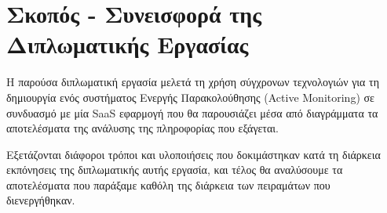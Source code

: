 \section{Σκοπός - Συνεισφορά της Διπλωματικής Εργασίας}
\label{section:contribution}

Η παρούσα διπλωματική εργασία μελετά τη χρήση σύγχρονων τεχνολογιών για τη δημιουργία
ενός συστήματος Ενεργής Παρακολούθησης (Active Monitoring) σε συνδυασμό με μία SaaS εφαρμογή
που θα παρουσιάζει μέσα από διαγράμματα τα αποτελέσματα της ανάλυσης της πληροφορίας που εξάγεται.

Εξετάζονται διάφοροι τρόποι και υλοποιήσεις που δοκιμάστηκαν κατά τη διάρκεια
εκπόνησεις της διπλωματικής αυτής εργασία, και τέλος θα αναλύσουμε τα αποτελέσματα
που παράξαμε καθόλη της διάρκεια των πειραμάτων που διενεργήθηκαν.  